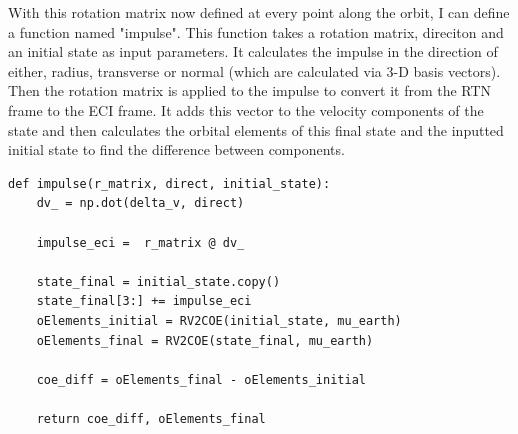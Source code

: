 \documentclass[12pt,twocolumn]{article}  %
\begin{document}
With this rotation matrix now defined at every point along the orbit, I can define a function named "impulse". This function
takes a rotation matrix, direciton and an initial state as input parameters. It calculates the impulse in the direction of either, 
radius, transverse or normal (which are calculated via 3-D basis vectors). Then the rotation matrix is applied to the impulse to convert
it from the RTN frame to the ECI frame. It adds this vector to the velocity components of the state and then calculates the orbital 
elements of this final state and the inputted initial state to find the difference between components. 
\begin{lstlisting}
def impulse(r_matrix, direct, initial_state):
    dv_ = np.dot(delta_v, direct)

    impulse_eci =  r_matrix @ dv_

    state_final = initial_state.copy()
    state_final[3:] += impulse_eci
    oElements_initial = RV2COE(initial_state, mu_earth)
    oElements_final = RV2COE(state_final, mu_earth)

    coe_diff = oElements_final - oElements_initial

    return coe_diff, oElements_final
\end{lstlisting}
\end{document}
